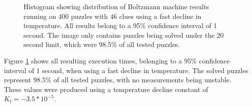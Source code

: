 \documentclass[a4paper,11pt]{kth-mag}
\begin{document}
\begin{figure}[here] 
\noindent{}
\vspace{-15pt}
\caption[Histogram with distribution of Boltzmann machine with fast decline]{Histogram showing distribution of Boltzmann machine results running on 400 puzzles with 46 clues using a fast decline in temperature. All results belong to a 95\% confidence interval of 1 second. The image only contains puzzles being solved under the 20 second limit, which were 98.5\% of all tested puzzles.}
\label{fig:boltzmannFast}
\end{figure}

Figure \ref{fig:boltzmannFast} shows all resulting execution times, belonging to a 95\% confidence interval of 1 second, when using a fast decline in temperature.
The solved puzzles represent 98.5\% of all tested puzzles, with no measurements being unstable.
These values were produced using a temperature decline constant of $K_t = -3.5*10^{-5}$.
\end{document}
